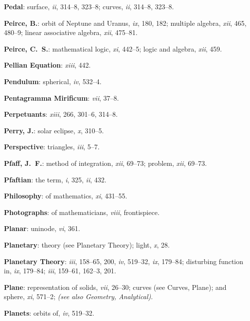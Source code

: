 \documentclass[11pt,a4paper]{article}
\newcommand{\IndexEntry}[1]{\textbf{#1}}
\newcommand{\SeeAlso}[1]{\textit{(see also #1)}}
\newcommand{\V}[1]{\textit{#1}} %
\begin{document}
\IndexEntry{Pedal}: surface, \V{ii}, 314--8, 323--8; curves, \V{ii}, 314--8, 323--8.

\newpage

\setcounter{page}{116}

\IndexEntry{Peirce, B.}: orbit of Neptune and Uranus, \V{ix}, 180, 182; multiple algebra, \V{xii}, 465, 480--9; linear associative algebra, \V{xii}, 475--81.

\IndexEntry{Peirce, C.\ S.}: mathematical logic, \V{xi}, 442--5; logic and algebra, \V{xii}, 459.

\IndexEntry{Pellian Equation}: \V{xiii}, 442.

\IndexEntry{Pendulum}: spherical, \V{iv}, 532--4.

\IndexEntry{Pentagramma Mirificum}: \V{vii}, 37--8.

\IndexEntry{Perpetuants}: \V{xiii}, 266, 301--6, 314--8.

\IndexEntry{Perry, J.}: solar eclipse, \V{x}, 310--5.

\IndexEntry{Perspective}: triangles, \V{iii}, 5--7.

\IndexEntry{Pfaff, J.\ F.}: method of integration, \V{xii}, 69--73; problem, \V{xii}, 69--73.

\IndexEntry{Pfaftian}: the term, \V{i}, 325, \V{ii}, 432.

\IndexEntry{Philosophy}: of mathematics, \V{xi}, 431--55.

\IndexEntry{Photographs}: of mathematicians, \V{viii}, frontispiece.

\IndexEntry{Planar}: uninode, \V{vi}, 361.

\IndexEntry{Planetary}: theory (see Planetary Theory); light, \V{x}, 28.

\IndexEntry{Planetary Theory}: \V{iii}, 158--65, 200, \V{iv}, 519--32, \V{ix}, 179--84; disturbing function in, \V{ix}, 179--84; \V{iii}, 159--61, 162--3, 201.

\IndexEntry{Plane}: representation of solids, \V{vii}, 26--30; curves (see Curves, Plane); and sphere, \V{xi}, 571--2; \SeeAlso{Geometry, Analytical}.

\IndexEntry{Planets}: orbits of, \V{iv}, 519--32.

\newpage

\setcounter{page}{117}
\end{document}
